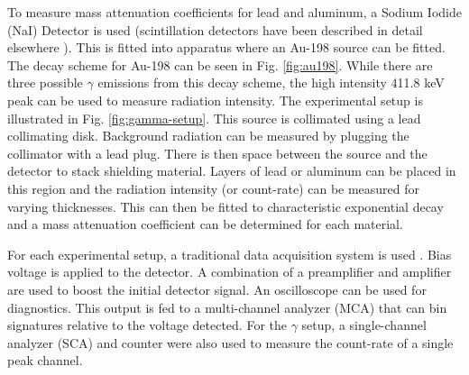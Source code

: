 To measure mass attenuation coefficients for lead and aluminum, a Sodium Iodide (NaI) Detector is used (scintillation detectors have been described in detail elsewhere \cite{krane}). This is fitted into apparatus where an Au-198 source can be fitted. The decay scheme for Au-198 can be seen in Fig. \ref{fig:au198}. While there are three possible $\gamma$ emissions from this decay scheme, the high intensity 411.8 keV peak can be used to measure radiation intensity. The experimental setup is illustrated in Fig. \ref{fig:gamma-setup}. This source is collimated using a lead collimating disk. Background radiation can be measured by plugging the collimator with a lead plug. There is then space between the source and the detector to stack shielding material. Layers of lead or aluminum can be placed in this region and the radiation intensity (or count-rate) can be measured for varying thicknesses. This can then be fitted to characteristic exponential decay and a mass attenuation coefficient can be determined for each material.

For each experimental setup, a traditional data acquisition system is used \cite{knoll}. Bias voltage is applied to the detector. A combination of a preamplifier and amplifier are used to boost the initial detector signal. An oscilloscope can be used for diagnostics. This output is fed to a multi-channel analyzer (MCA) that can bin signatures relative to the voltage detected. For the $\gamma$ setup, a single-channel analyzer (SCA) and counter were also used to measure the count-rate of a single peak channel.
